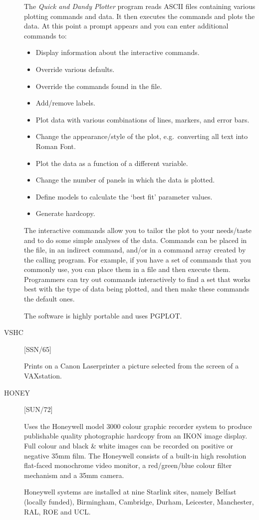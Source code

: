 \begin{description}
The {\em Quick and Dandy Plotter} program reads ASCII files containing
various plotting commands and data.
It then executes the commands and plots the data.
At this point a prompt appears and you can enter additional commands to:
\begin{itemize}
\item Display information about the interactive commands.
\item Override various defaults.
\item Override the commands found in the file.
\item Add/remove labels.
\item Plot data with various combinations of lines, markers, and error bars.
\item Change the appearance/style of the plot, e.g.\ converting all text into
 Roman Font.
\item Plot the data as a function of a different variable.
\item Change the number of panels in which the data is plotted.
\item Define models to calculate the `best fit' parameter values.
\item Generate hardcopy.
\end{itemize}
The interactive commands allow you to tailor the plot to your needs/taste
and to do some simple analyses of the data.
Commands can be placed in the file, in an indirect command, and/or in a command
array created by the calling program.
For example, if you have a set of commands that you commonly use, you can
place them in a file and then execute them.
Programmers can try out commands interactively to find a set that works
best with the type of data being plotted, and then make these commands the
default ones.

The software is highly portable and uses PGPLOT.

\item [VSHC] \hfill [SSN/65]

Prints on a Canon Laserprinter a picture selected from the screen of a
VAXstation.

\item [HONEY] \hfill [SUN/72]

Uses the Honeywell model 3000 colour graphic recorder system to produce
publishable quality photographic hardcopy from an IKON image display.
Full colour and black \& white images can be recorded on positive or negative
35mm film.
The Honeywell consists of a built-in high resolution flat-faced monochrome
video monitor, a red/green/blue colour filter mechanism and a 35mm camera.

Honeywell systems are installed at nine Starlink sites, namely Belfast
(locally funded), Birmingham, Cambridge, Durham, Leicester, Manchester,
RAL, ROE and UCL.

\end{description}

